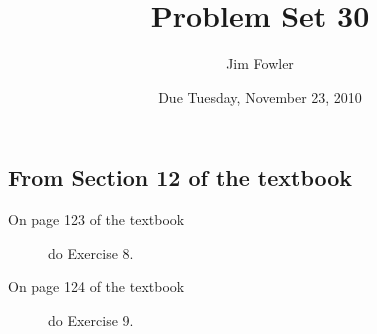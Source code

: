 \documentclass[12pt]{handout}
\author{Jim Fowler}
\title{Problem Set 30}
\date{Due Tuesday, November 23, 2010}
\begin{document}
\maketitle










\subsection*{From Section 12 of the textbook}



\begin{description}

\item[On page 123 of the textbook] do Exercise 8.

\item[On page 124 of the textbook] do Exercise 9.

\end{description}
\end{document}
